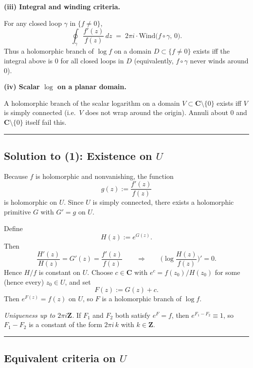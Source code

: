\documentclass[11pt]{article}
\begin{document}
\medskip

\noindent\textbf{(iii) Integral and winding criteria.}

For any closed loop $\gamma$ in $\{f\neq 0\}$,
\[
\oint_{\gamma}\frac{f'(z)}{f(z)}\,dz \;=\; 2\pi i \cdot \mathrm{Wind}\!\big(f\circ\gamma,\,0\big).
\]
Thus a holomorphic branch of $\log f$ on a domain $D\subset\{f\neq 0\}$ exists iff the integral above is $0$ for all closed loops in $D$ (equivalently, $f\circ\gamma$ never winds around $0$).

\medskip

\noindent\textbf{(iv) Scalar $\log$ on a planar domain.}

A holomorphic branch of the scalar logarithm on a domain $V\subset\mathbf{C}\setminus\{0\}$ exists iff $V$ is simply connected (i.e.\ $V$ does not wrap around the origin). Annuli about $0$ and $\mathbf{C}\setminus\{0\}$ itself fail this.

\bigskip\hrule\bigskip

\subsection*{Solution to (1): Existence on $U$}

Because $f$ is holomorphic and nonvanishing, the function
\[
g(z) := \frac{f'(z)}{f(z)}
\]
is holomorphic on $U$. Since $U$ is simply connected, there exists a holomorphic primitive $G$ with $G'=g$ on $U$.

\medskip

Define
\[
H(z) := e^{G(z)} .
\]
Then
\[
\frac{H'(z)}{H(z)} = G'(z) = \frac{f'(z)}{f(z)}
\qquad\Longrightarrow\qquad
\Big(\log\frac{H(z)}{f(z)}\Big)'=0 .
\]
Hence $H/f$ is constant on $U$. Choose $c\in\mathbf{C}$ with $e^{c} = f(z_0)/H(z_0)$ for some (hence every) $z_0\in U$, and set
\[
F(z) := G(z) + c .
\]
Then $e^{F(z)} = f(z)$ on $U$, so $F$ is a holomorphic branch of $\log f$.

\medskip

\noindent\textit{Uniqueness up to $2\pi i\mathbf{Z}$.}
If $F_1$ and $F_2$ both satisfy $e^{F}=f$, then $e^{F_1-F_2}\equiv 1$, so $F_1-F_2$ is a constant of the form $2\pi i\,k$ with $k\in\mathbf{Z}$.

\bigskip\hrule\bigskip

\subsection*{Equivalent criteria on $U$}

\medskip
\end{document}
